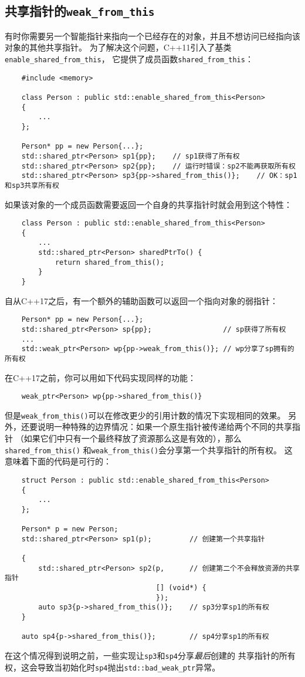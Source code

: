 \subsection{共享指针的\texttt{weak\_from\_this}}
有时你需要另一个智能指针来指向一个已经存在的对象，并且不想访问已经指向该对象的其他共享指针。
为了解决这个问题，C++11引入了基类\texttt{enable\_shared\_from\_this}，
它提供了成员函数\texttt{shared\_from\_this}：
\begin{lstlisting}
    #include <memory>

    class Person : public std::enable_shared_from_this<Person>
    {
        ...
    };

    Person* pp = new Person{...};
    std::shared_ptr<Person> sp1{pp};    // sp1获得了所有权
    std::shared_ptr<Person> sp2{pp};    // 运行时错误：sp2不能再获取所有权
    std::shared_ptr<Person> sp3{pp->shared_from_this()};    // OK：sp1和sp3共享所有权
\end{lstlisting}
如果该对象的一个成员函数需要返回一个自身的共享指针时就会用到这个特性：
\begin{lstlisting}
    class Person : public std::enable_shared_from_this<Person>
    {
        ...
        std::shared_ptr<Person> sharedPtrTo() {
            return shared_from_this();
        }
    }
\end{lstlisting}
自从C++17之后，有一个额外的辅助函数可以返回一个指向对象的弱指针：
\begin{lstlisting}
    Person* pp = new Person{...};
    std::shared_ptr<Person> sp{pp};                 // sp获得了所有权
    ...
    std::weak_ptr<Person> wp{pp->weak_from_this()}; // wp分享了sp拥有的所有权
\end{lstlisting}
在C++17之前，你可以用如下代码实现同样的功能：
\begin{lstlisting}
    weak_ptr<Person> wp{pp->shared_from_this()}
\end{lstlisting}
但是\texttt{weak\_from\_this()}可以在修改更少的引用计数的情况下实现相同的效果。
另外，还要说明一种特殊的边界情况：如果一个原生指针被传递给两个不同的共享指针
（如果它们中只有一个最终释放了资源那么这是有效的），那么\texttt{shared\_from\_this()}
和\texttt{weak\_from\_this()}会分享第一个共享指针的所有权。
这意味着下面的代码是可行的：
\begin{lstlisting}
    struct Person : public std::enable_shared_from_this<Person>
    {
        ...
    };

    Person* p = new Person;
    std::shared_ptr<Person> sp1(p);         // 创建第一个共享指针

    {
        std::shared_ptr<Person> sp2(p,      // 创建第二个不会释放资源的共享指针
                                    [] (void*) {
                                    });
        auto sp3{p->shared_from_this()};    // sp3分享sp1的所有权
    }

    auto sp4{p->shared_from_this()};        // sp4分享sp1的所有权
\end{lstlisting}
在这个情况得到说明之前，一些实现让\texttt{sp3}和\texttt{sp4}分享\emph{最后}创建的
共享指针的所有权，这会导致当初始化时\texttt{sp4}抛出\texttt{std::bad\_weak\_ptr}异常。


